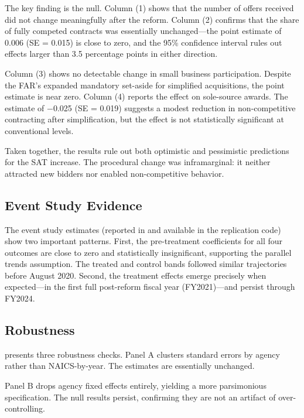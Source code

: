 \documentclass[12pt]{article}
\begin{document}
The key finding is the null. Column (1) shows that the number of offers received did not change meaningfully after the reform. Column (2) confirms that the share of fully competed contracts was essentially unchanged---the point estimate of 0.006 (SE = 0.015) is close to zero, and the 95\% confidence interval rules out effects larger than 3.5 percentage points in either direction.

Column (3) shows no detectable change in small business participation. Despite the FAR's expanded mandatory set-aside for simplified acquisitions, the point estimate is near zero. Column (4) reports the effect on sole-source awards. The estimate of $-$0.025 (SE = 0.019) suggests a modest reduction in non-competitive contracting after simplification, but the effect is not statistically significant at conventional levels.

Taken together, the results rule out both optimistic and pessimistic predictions for the SAT increase. The procedural change was inframarginal: it neither attracted new bidders nor enabled non-competitive behavior.

\subsection{Event Study Evidence}

The event study estimates (reported in  and available in the replication code) show two important patterns. First, the pre-treatment coefficients for all four outcomes are close to zero and statistically insignificant, supporting the parallel trends assumption. The treated and control bands followed similar trajectories before August 2020. Second, the treatment effects emerge precisely when expected---in the first full post-reform fiscal year (FY2021)---and persist through FY2024.

\subsection{Robustness}



 presents three robustness checks. Panel A clusters standard errors by agency rather than NAICS-by-year. The estimates are essentially unchanged.

Panel B drops agency fixed effects entirely, yielding a more parsimonious specification. The null results persist, confirming they are not an artifact of over-controlling.
\end{document}
